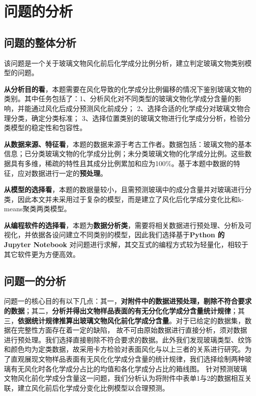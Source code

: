 \documentclass{MathModeling}
\begin{document}
	\section{问题的分析}
	\subsection{问题的整体分析}
	该问题是一个关于玻璃文物风化前后化学成分比例分析，建立判定玻璃文物类别模型的问题。
	
	\textbf{从分析目的看}，本题需要在风化导致的化学成分比例偏移的情况下鉴别玻璃文物的类别。其中任务包括了：1、分析风化对不同类型的玻璃文物化学成分含量的影响，并能通过风化后成分预测风化前成分； 2、选择合适的化学成分对玻璃文物合理分类，确定分类标准； 3、选择位置类别的玻璃文物进行化学成分分析，检验分类模型的稳定性和包容性。

	\textbf{从数据来源、特征看}，本题的数据来源于考古工作者。数据包括：玻璃文物的基本信息；已分类玻璃文物的化学成分比例；未分类玻璃文物的化学成分比例。这些数据具有多维，稀疏的特性且其成分比例累加和应为100$\%$。基于本题中数据的特征，应对数据进行一定的{\textbf{预处理}}。

	\textbf{从模型的选择看}，本题的数据量较小，且需预测玻璃中的成分含量并对玻璃进行分类，因此本文并未采用过于复杂的模型，而是建立了{\heiti 风化后化学成分变化比}和{\heiti k-means聚类}两类模型。

	\textbf{从编程软件的选择看}，本题为{\textbf{数据分析类}}，需要将相关数据进行预处理、分析及可视化，并依据各设问建立不同类别的模型，因此我们选择基于{\textbf {Python 的 Jupyter Notebook}} 对问题进行求解，其交互式的编程方式较为轻量化，相较于其它软件更为方便高效。
	
	\subsection{问题一的分析}
	问题一的核心目的有以下几点：{\heiti 其一}，{\textbf{对附件中的数据进预处理，剔除不符合要求的数据}}；{\heiti 其二}，{\textbf{分析并得出文物样品表面的有无分化化学成分含量统计规律}}；{\heiti 其三}，{\textbf{依据统计规律推算出玻璃文物风化前化学成分含量}}。对于已给定的数据集，数据在完整性方面存在着一定的缺陷，
	故不可由原始数据进行直接分析，须对数据进行预处理。我们选择直接剔除不符合要求的数据。此外我们发现{\heiti 玻璃类型、纹饰和颜色}均为定类数据，故采用卡方检验对表面风化与以上三者的关系进行研究。为了直观展现文物样品表面有无风化化学成分含量的统计规律，我们选择绘制两种玻璃有无风化时各化学成分占比的均值和各化学成分占比的箱线图。
	针对预测玻璃文物风化前化学成分含量这一问题，我们分析认为将附件中表单1与2的数据相互关联，建立风化前后化学成分变化比例模型以合理预测。
\end{document}
